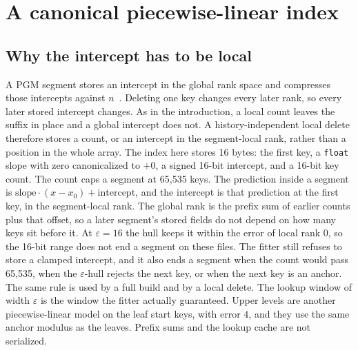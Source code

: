 \documentclass[conference]{IEEEtran}
\begin{document}
\section{A canonical piecewise-linear index}
\label{sec:design}

\subsection{Why the intercept has to be local}

A PGM segment stores an intercept in the global rank space and compresses those intercepts against $n$~\cite{ferragina2020pgm}.
Deleting one key changes every later rank, so every later stored intercept changes.
As in the introduction, a local count leaves the suffix in place and a global intercept does not.
A history-independent local delete therefore stores a count, or an intercept in the segment-local rank, rather than a position in the whole array.
The index here stores 16 bytes: the first key, a \texttt{float} slope with zero canonicalized to $+0$, a signed 16-bit intercept, and a 16-bit key count.
The count caps a segment at 65{,}535 keys.
The prediction inside a segment is $\mathrm{slope}\cdot(x-x_0)+\mathrm{intercept}$, and the intercept is that prediction at the first key, in the segment-local rank.
The global rank is the prefix sum of earlier counts plus that offset, so a later segment's stored fields do not depend on how many keys sit before it.
At $\varepsilon=16$ the hull keeps it within the error of local rank 0, so the 16-bit range does not end a segment on these files.
The fitter still refuses to store a clamped intercept, and it also ends a segment when the count would pass 65{,}535, when the $\varepsilon$-hull rejects the next key, or when the next key is an anchor.
The same rule is used by a full build and by a local delete.
The lookup window of width $\varepsilon$ is the window the fitter actually guaranteed.
Upper levels are another piecewise-linear model on the leaf start keys, with error $4$, and they use the same anchor modulus as the leaves.
Prefix sums and the lookup cache are not serialized.
\end{document}
